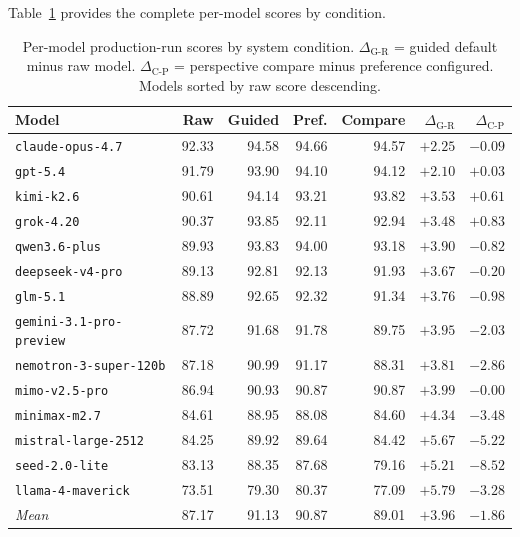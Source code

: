 \documentclass[11pt]{article}
\begin{document}
Table~\ref{tab:models} provides the complete per-model scores by condition.

\begin{table}[htbp]
\centering
\small
\setlength{\tabcolsep}{5pt}
\begin{tabular}{lrrrrrr}
\toprule
Model & Raw & Guided & Pref. & Compare &
  $\Delta_\text{G-R}$ & $\Delta_\text{C-P}$ \\
\midrule
\texttt{claude-opus-4.7}         & 92.33 & 94.58 & 94.66 & 94.57 & $+2.25$ & $-0.09$ \\
\texttt{gpt-5.4}                 & 91.79 & 93.90 & 94.10 & 94.12 & $+2.10$ & $+0.03$ \\
\texttt{kimi-k2.6}               & 90.61 & 94.14 & 93.21 & 93.82 & $+3.53$ & $+0.61$ \\
\texttt{grok-4.20}               & 90.37 & 93.85 & 92.11 & 92.94 & $+3.48$ & $+0.83$ \\
\texttt{qwen3.6-plus}            & 89.93 & 93.83 & 94.00 & 93.18 & $+3.90$ & $-0.82$ \\
\texttt{deepseek-v4-pro}         & 89.13 & 92.81 & 92.13 & 91.93 & $+3.67$ & $-0.20$ \\
\texttt{glm-5.1}                 & 88.89 & 92.65 & 92.32 & 91.34 & $+3.76$ & $-0.98$ \\
\texttt{gemini-3.1-pro-preview}  & 87.72 & 91.68 & 91.78 & 89.75 & $+3.95$ & $-2.03$ \\
\texttt{nemotron-3-super-120b}   & 87.18 & 90.99 & 91.17 & 88.31 & $+3.81$ & $-2.86$ \\
\texttt{mimo-v2.5-pro}           & 86.94 & 90.93 & 90.87 & 90.87 & $+3.99$ & $-0.00$ \\
\texttt{minimax-m2.7}            & 84.61 & 88.95 & 88.08 & 84.60 & $+4.34$ & $-3.48$ \\
\texttt{mistral-large-2512}      & 84.25 & 89.92 & 89.64 & 84.42 & $+5.67$ & $-5.22$ \\
\texttt{seed-2.0-lite}           & 83.13 & 88.35 & 87.68 & 79.16 & $+5.21$ & $-8.52$ \\
\texttt{llama-4-maverick}        & 73.51 & 79.30 & 80.37 & 77.09 & $+5.79$ & $-3.28$ \\
\midrule
\textit{Mean}                    & 87.17 & 91.13 & 90.87 & 89.01 & $+3.96$ & $-1.86$ \\
\bottomrule
\end{tabular}
\caption{Per-model production-run scores by system condition. $\Delta_\text{G-R}$
  = guided default minus raw model. $\Delta_\text{C-P}$ = perspective compare minus
  preference configured. Models sorted by raw score descending.}
\label{tab:models}
\end{table}
\end{document}
